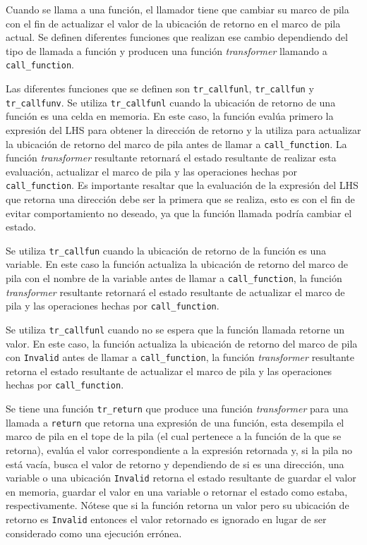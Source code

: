 Cuando se llama a una función, el llamador tiene que cambiar su marco de pila con el fin de actualizar el valor de la ubicación de retorno en el marco de pila actual.
Se definen diferentes funciones que realizan ese cambio dependiendo del tipo de llamada a función y producen una función \textit{transformer} llamando a \verb|call_function|.

Las diferentes funciones que se definen son \verb|tr_callfunl|, \verb|tr_callfun| y \verb|tr_callfunv|.
Se utiliza \verb|tr_callfunl| cuando la ubicación de retorno de una función es una celda en memoria.
En este caso, la función evalúa primero la expresión del LHS para obtener la dirección de retorno y la utiliza para actualizar la ubicación de retorno del marco de pila antes de llamar a \verb|call_function|.
La función \textit{transformer} resultante retornará el estado resultante de realizar esta evaluación, actualizar el marco de pila y las operaciones hechas por \verb|call_function|.
Es importante resaltar que la evaluación de la expresión del LHS que retorna una dirección debe ser la primera que se realiza, esto es con el fin de evitar comportamiento no deseado, ya que la función llamada podría cambiar el estado.

Se utiliza \verb|tr_callfun| cuando la ubicación de retorno de la función es una variable.
En este caso la función actualiza la ubicación de retorno del marco de pila con el nombre de la variable antes de llamar a \verb|call_function|, la función \textit{transformer} resultante retornará el estado resultante de actualizar el marco de pila y las operaciones hechas por \verb|call_function|.

Se utiliza \verb|tr_callfunl| cuando no se espera que la función llamada retorne un valor.
En este caso, la función actualiza la ubicación de retorno del marco de pila con \verb|Invalid| antes de llamar a \verb|call_function|, la función \textit{transformer} resultante retorna el estado resultante de actualizar el marco de pila y las operaciones hechas por \verb|call_function|.

Se tiene una función \verb|tr_return| que produce una función \textit{transformer} para una llamada a \verb|return| que retorna una expresión de una función, esta desempila el marco de pila en el tope de la pila (el cual pertenece a la función de la que se retorna), evalúa el valor correspondiente a la expresión retornada y, si la pila no está vacía, busca el valor de retorno y dependiendo de si es una dirección, una variable o una ubicación \verb|Invalid| retorna el estado resultante de guardar el valor en memoria, guardar el valor en una variable o retornar el estado como estaba, respectivamente.
Nótese que si la función retorna un valor pero su ubicación de retorno es \verb|Invalid| entonces el valor retornado es ignorado en lugar de ser considerado como una ejecución errónea.

